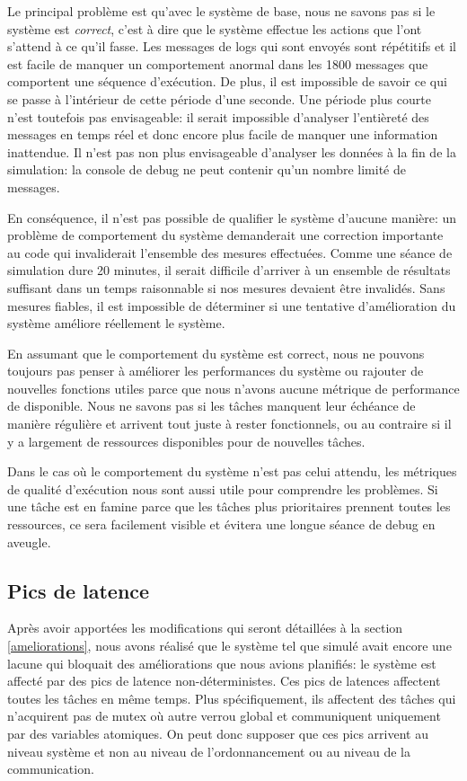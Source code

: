 \documentclass[journal]{IEEEtran}
\begin{document}
Le principal problème est qu'avec le système de base, nous ne savons pas si le système est \emph{correct}, c'est à dire que le système effectue les actions que l'ont s'attend à ce qu'il fasse. Les messages de logs qui sont envoyés sont répétitifs et il est facile de manquer un comportement anormal dans les 1800 messages que comportent une séquence d'exécution. De plus, il est impossible de savoir ce qui se passe à l'intérieur de cette période d'une seconde. Une période plus courte n'est toutefois pas envisageable: il serait impossible d'analyser l'entièreté des messages en temps réel et donc encore plus facile de manquer une information inattendue. Il n'est pas non plus envisageable d'analyser les données à la fin de la simulation: la console de debug ne peut contenir qu'un nombre limité de messages.

En conséquence, il n'est pas possible de qualifier le système d'aucune manière: un problème de comportement du système demanderait une correction importante au code qui invaliderait l'ensemble des mesures effectuées. Comme une séance de simulation dure 20 minutes, il serait difficile d'arriver à un ensemble de résultats suffisant dans un temps raisonnable si nos mesures devaient être invalidés. Sans mesures fiables, il est impossible de déterminer si une tentative d'amélioration du système améliore réellement le système.

En assumant que le comportement du système est correct, nous ne pouvons toujours pas penser à améliorer les performances du système ou rajouter de nouvelles fonctions utiles parce que nous n'avons aucune métrique de performance de disponible. Nous ne savons pas si les tâches manquent leur échéance de manière régulière et arrivent tout juste à rester fonctionnels, ou au contraire si il y a largement de ressources disponibles pour de nouvelles tâches.

Dans le cas où le comportement du système n'est pas celui attendu, les métriques de qualité d'exécution nous sont aussi utile pour comprendre les problèmes. Si une tâche est en famine parce que les tâches plus prioritaires prennent toutes les ressources, ce sera facilement visible et évitera une longue séance de debug en aveugle.

\subsection{Pics de latence}

Après avoir apportées les modifications qui seront détaillées à la section \ref{ameliorations}, nous avons réalisé que le système tel que simulé avait encore une lacune qui bloquait des améliorations que nous avions planifiés: le système est affecté par des pics de latence non-déterministes. Ces pics de latences affectent toutes les tâches en même temps. Plus spécifiquement, ils affectent des tâches qui n'acquirent pas de mutex où autre verrou global et communiquent uniquement par des variables atomiques. On peut donc supposer que ces pics arrivent au niveau système et non au niveau de l'ordonnancement ou au niveau de la communication. 
\end{document}
